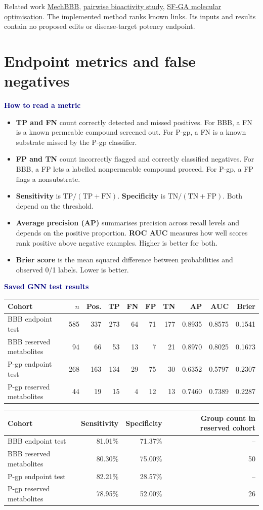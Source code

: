 \documentclass[11pt,a4paper]{article}
\newcommand{\lead}[1]{\par\smallskip\textbf{\textcolor{Navy}{#1}}\par\nobreak}
\newcommand{\pagehead}[1]{\clearpage\section{#1}}
\newcommand{\src}[2]{\href{#1}{#2}}
\newenvironment{compact}{\begin{itemize}[leftmargin=*,topsep=2pt,itemsep=1pt,parsep=0pt]}{\end{itemize}}
\newcommand{\dense}{\small\renewcommand{\arraystretch}{1.11}\setlength{\tabcolsep}{4pt}}
\begin{document}
Related work \src{https://pmc.ncbi.nlm.nih.gov/articles/PMC13708059/}{MechBBB},
\src{https://pmc.ncbi.nlm.nih.gov/articles/PMC13343518/}{pairwise bioactivity study},
\src{https://doi.org/10.1021/acs.jcim.6c01938}{SF-GA molecular optimisation}.
The implemented method ranks known links. Its inputs and results contain no proposed edits or disease-target potency endpoint.

\pagehead{Endpoint metrics and false negatives}\label{sec:results}
\lead{How to read a metric}
\begin{compact}
\item \textbf{TP and FN} count correctly detected and missed positives. For BBB, a FN is a known permeable compound screened out. For P-gp, a FN is a known substrate missed by the P-gp classifier.
\item \textbf{FP and TN} count incorrectly flagged and correctly classified negatives. For BBB, a FP lets a labelled nonpermeable compound proceed. For P-gp, a FP flags a nonsubstrate.
\item \textbf{Sensitivity} is $\mathrm{TP}/(\mathrm{TP}+\mathrm{FN})$. \textbf{Specificity} is $\mathrm{TN}/(\mathrm{TN}+\mathrm{FP})$. Both depend on the threshold.
\item \textbf{Average precision (AP)} summarises precision across recall levels and depends on the positive proportion. \textbf{ROC AUC} measures how well scores rank positive above negative examples. Higher is better for both.
\item \textbf{Brier score} is the mean squared difference between probabilities and observed 0/1 labels. Lower is better.
\end{compact}

\lead{Saved GNN test results}
{\dense
\begin{tabularx}{\linewidth}{Yrrrrrrrrr}
\toprule
Cohort & $n$ & Pos. & TP & FN & FP & TN & AP & AUC & Brier\\
\midrule
BBB endpoint test & 585 & 337 & 273 & 64 & 71 & 177 & 0.8935 & 0.8575 & 0.1541\\
BBB reserved metabolites & 94 & 66 & 53 & 13 & 7 & 21 & 0.8970 & 0.8025 & 0.1673\\
P-gp endpoint test & 268 & 163 & 134 & 29 & 75 & 30 & 0.6352 & 0.5797 & 0.2307\\
P-gp reserved metabolites & 44 & 19 & 15 & 4 & 12 & 13 & 0.7460 & 0.7389 & 0.2287\\
\bottomrule
\end{tabularx}}

{\dense
\begin{tabularx}{\linewidth}{Yrrr}
\toprule
Cohort & Sensitivity & Specificity & Group count in reserved cohort\\
\midrule
BBB endpoint test & 81.01\% & 71.37\% & --\\
BBB reserved metabolites & 80.30\% & 75.00\% & 50\\
P-gp endpoint test & 82.21\% & 28.57\% & --\\
P-gp reserved metabolites & 78.95\% & 52.00\% & 26\\
\bottomrule
\end{tabularx}}
\end{document}
